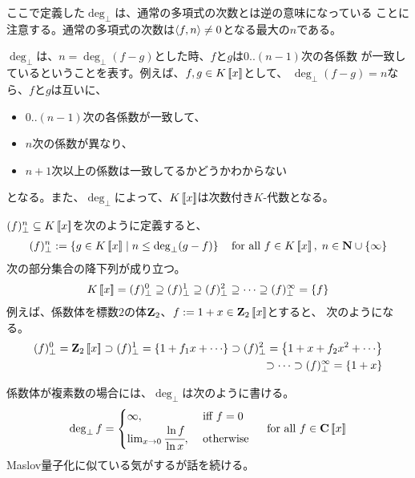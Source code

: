 {	ここで定義した$\deg_\bot$は、通常の多項式の次数とは逆の意味になっている
	ことに注意する。通常の多項式の次数は$\mathinner{\langle{f,n}\rangle}\neq0$となる最大の$n$である。

	$\deg_\bot$は、$n=\deg_\bot(f-g)$とした時、$f$と$g$は$0..(n-1)$次の各係数
	が一致しているということを表す。例えば、$f,g\in K\mathinner{[\![{x}]\!]}$として、
	$\deg_\bot(f-g)=n$なら、$f$と$g$は互いに、
	\begin{itemize}\setlength{\itemsep}{-1mm} %
		\item $0..(n-1)$次の各係数が一致して、
		\item $n$次の係数が異なり、
		\item $n+1$次以上の係数は一致してるかどうかわからない
	\end{itemize} %
	となる。また、$\deg_\bot$によって、$K\mathinner{[\![{x}]\!]}$は次数付き$K$-代数となる。

	$(f)_\bot^n\subseteq K\mathinner{[\![{x}]\!]}$を次のように定義すると、
	\begin{equation*}\begin{split}
		(f)_\bot^n := \mathinner{\left\{{g\in K\mathinner{[\![{x}]\!]}\mid n\le \deg_\bot(g-f)}\right\}}
		\quad\text{for all } f\in K\mathinner{[\![{x}]\!]},\; n\in\mathbf{N}\cup\mathinner{\left\{{\infty}\right\}}
	\end{split}\end{equation*}
	次の部分集合の降下列が成り立つ。
	\begin{equation*}\begin{split}
		K\mathinner{[\![{x}]\!]} = (f)_\bot^0 \supseteq (f)_\bot^1 \supseteq (f)_\bot^2
		\supseteq \cdots \supseteq (f)_\bot^\infty = \mathinner{\left\{{f}\right\}}
	\end{split}\end{equation*}
	例えば、係数体を標数$2$の体$\mathbf{Z}_2$、$f:=1+x\in\mathbf{Z}_2\mathinner{[\![{x}]\!]}$とすると、
	次のようになる。
	\begin{equation*}\begin{split}
		(f)_\bot^0 = \mathbf{Z}_2\mathinner{[\![{x}]\!]} 
		\supset (f)_\bot^1 = \mathinner{\left\{{1 + f_1 x + \cdots}\right\}}
		\supset (f)_\bot^2 = \mathinner{\left\{{1 + x + f_2x^2 + \cdots}\right\}} \\
		\supset \cdots \supset (f)_\bot^\infty = \mathinner{\left\{{1 + x}\right\}}
	\end{split}\end{equation*}

	係数体が複素数の場合には、$\deg_\bot$は次のように書ける。
	\begin{equation*}\begin{split}
		\deg_\bot f = \begin{cases}
			\infty, &\text{ iff } f = 0 \\
			\lim_{x\to0}\cfrac{\ln f}{\ln x}, &\text{ otherwise } \\
		\end{cases} \quad\text{for all } f\in \mathbf{C}\mathinner{[\![{x}]\!]}
	\end{split}\end{equation*}
	Maslov量子化に似ている気がするが話を続ける。

}
